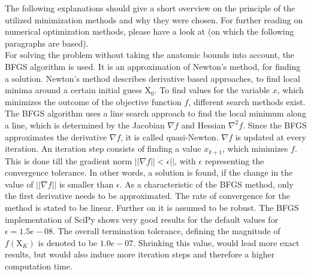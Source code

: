 The following explanations should give a short overview on the principle of the utilized minimization methods and why they were chosen. For further reading on numerical optimization methods, please have a look at \cite{nocedal2006numerical} (on which the following paragraphs are based).\\
For solving the problem without taking the anatomic bounds into account, the \ac{BFGS} algorithm is used. It is an approximation of Newton's method, for finding a solution. Newton's method describes derivative based approaches, to find local minima around a certain initial guess $ \mathrm{X}_{0} $. To find values for the variable $ x $, which minimizes the outcome of the objective function $ f $, different search methods exist. The \ac{BFGS} algorithm uses a line search approach to find the local minimum along a line, which is determined by the Jacobian $ \nabla f $ and Hessian $ \nabla^{2} f $. Since the \ac{BFGS} approximates the derivative  $ \nabla f $, it is called quasi-Newton. $ \nabla f $ is updated at every iteration. An iteration step consists of finding a value $ x_{k+1} $, which minimizes $ f $. This is done till the gradient norm $ || \nabla f|| < \epsilon ||$, with $ \epsilon $ representing the convergence tolerance. In other words, a solution is found, if the change in the value of $ ||\nabla f|| $ is smaller than $ \epsilon $. As a characteristic of the \ac{BFGS} method, only the first derivative needs to be approximated. The rate of convergence for the method is stated to be linear. Further on it is assumed to be robust. The \ac{BFGS} implementation of SciPy shows very good results for the default values for $ \epsilon = 1.5e-08 $. The overall termination tolerance, defining the magnitude of $ f(\mathrm{X}_K) $ is denoted to be $ 1.0e-07 $. Shrinking this value, would lead more exact results, but would also induce more iteration steps and therefore a higher computation time.\\
